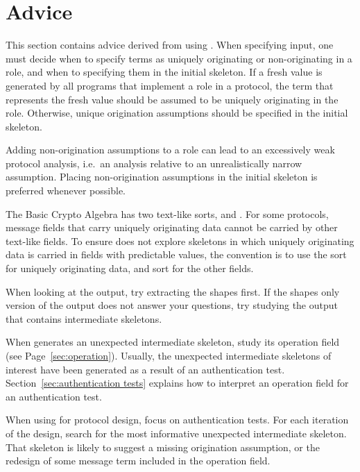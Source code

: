 \documentclass[12pt]{article}
\begin{document}
\section{Advice}\label{sec:advice}

This section contains advice derived from using {\cpsa}.  When
specifying {\cpsa} input, one must decide when to specify terms as
uniquely originating or non-originating in a role, and when to
specifying them in the initial skeleton.  If a fresh value is
generated by all programs that implement a role in a protocol, the
term that represents the fresh value should be assumed to be uniquely
originating in the role.  Otherwise, unique origination assumptions
should be specified in the initial skeleton.

Adding non-origination assumptions to a role can lead to an
excessively weak protocol analysis, i.e.\ an analysis relative to an
unrealistically narrow assumption.  Placing non-origination
assumptions in the initial skeleton is preferred whenever possible.

The Basic Crypto Algebra has two text-like sorts,  and
.  For some protocols, message fields that carry uniquely
originating data cannot be carried by other text-like fields.  To
ensure {\cpsa} does not explore skeletons in which uniquely
originating data is carried in fields with predictable values, the
convention is to use the sort  for uniquely originating
data, and sort  for the other fields.

When looking at the output, try extracting the shapes first.  If the
shapes only version of the output does not answer your questions, try
studying the output that contains intermediate skeletons.

When {\cpsa} generates an unexpected intermediate skeleton, study its
operation field (see Page~\ref{sec:operation}).  Usually, the
unexpected intermediate skeletons of interest have been generated as a
result of an authentication test.  Section~\ref{sec:authentication
  tests} explains how to interpret an operation field for an
authentication test.

When using {\cpsa} for protocol design, focus on authentication tests.
For each iteration of the design, search for the most informative
unexpected intermediate skeleton.  That skeleton is likely to suggest
a  missing origination assumption, or the redesign of some message
term included in the operation field.
\end{document}

